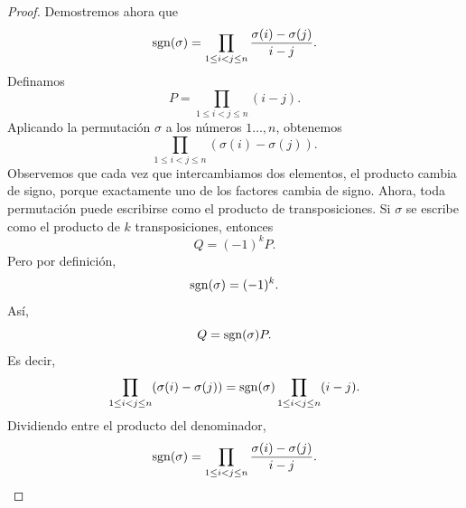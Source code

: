 \documentclass[12pt,a4paper]{article}
\begin{document}
\begin{proof}
        Demostremos ahora que
        \begin{equation*}
            \operatorname{sgn}(\sigma)=\prod_{1\leq i< j\leq n}\frac{\sigma(i)-\sigma(j)}{i-j}.
        \end{equation*}
        Definamos
        \begin{equation*}
            P=\prod_{1\leq i\lt j\leq n}(i-j).
        \end{equation*}
        Aplicando la permutación $\sigma$ a los números $1\dots, n$, obtenemos
        \begin{equation*}
            \prod_{1\leq i\lt j\leq n}(\sigma(i)-\sigma(j)).
        \end{equation*}
        Observemos que cada vez que intercambiamos dos elementos, el producto cambia de signo,
        porque exactamente uno de los factores cambia de signo. Ahora, toda permutación puede
        escribirse como el producto de transposiciones. Si $\sigma$ se escribe como el producto
        de $k$ transposiciones, entonces
        \begin{equation*}
            Q=(-1)^{k}P.
        \end{equation*}
        Pero por definición,
        \begin{equation*}
            \operatorname{sgn}(\sigma)=(-1)^{k}.
        \end{equation*}
        Así,
        \begin{equation*}
            Q=\operatorname{sgn}(\sigma)P.
        \end{equation*}
        Es decir,
        \begin{equation*}
            \prod_{1\leq i< j\leq n}(\sigma(i)-\sigma(j))=\operatorname{sgn}(\sigma)\prod_{1\leq i< j\leq n}(i-j).
        \end{equation*}
        Dividiendo entre el producto del denominador,
        \begin{equation*}
            \operatorname{sgn}(\sigma)=\prod_{1\leq i< j\leq n}\frac{\sigma(i)-\sigma(j)}{i-j}.
        \end{equation*}
    \end{proof}
\end{document}
